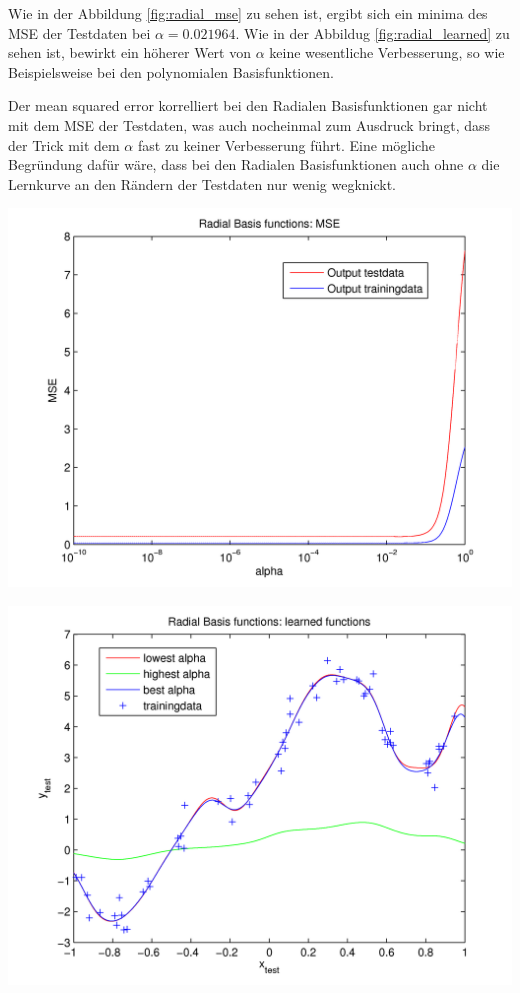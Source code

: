 Wie in der Abbildung \ref{fig:radial_mse} zu sehen ist, ergibt sich ein minima des MSE der Testdaten
bei $\alpha = 0.021964$. Wie in der Abbildug \ref{fig:radial_learned} zu sehen ist, bewirkt ein höherer Wert von
$\alpha$ keine wesentliche Verbesserung, so wie Beispielsweise bei den polynomialen Basisfunktionen.

Der mean squared error korrelliert bei den Radialen Basisfunktionen gar nicht mit dem MSE der Testdaten, was
auch nocheinmal zum Ausdruck bringt, dass der Trick mit dem $\alpha$ fast zu keiner Verbesserung führt.
Eine mögliche Begründung dafür wäre, dass bei den Radialen Basisfunktionen auch ohne $\alpha$ die Lernkurve
an den Rändern der Testdaten nur wenig wegknickt.


  \begin{center}
	\includegraphics[width=15cm]{figures/114/radial_mse.png}
	\label{fig:radial_mse}
  \end{center}

  \begin{center}
	\includegraphics[width=15cm]{figures/114/radial_learned.png}
	\label{fig:radial_learned}
  \end{center}

